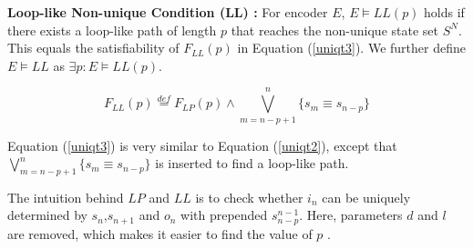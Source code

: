 \documentclass[journal]{IEEEtran}
\begin{document}
\begin{definition11}\label{def_llnc}%
\textbf{Loop-like Non-unique Condition ($\boldsymbol{LL}$) :}
For encoder $E$,
$E\vDash LL(p)$ holds if
there exists a loop-like path of length $p$ that reaches the non-unique state set $S^{N}$.
This equals the satisfiability of $F_{LL}(p)$ in Equation (\ref{uniqt3}).
We further define $E\vDash LL$ as $\exists p:E\vDash LL(p)$.



\end{definition11}


\begin{equation}\label{uniqt3}
F_{LL}(p)\overset{def}{=}F_{LP}(p)\wedge\bigvee_{m=n-p+1}^{n}\{s_m\equiv s_{n-p}\}
\end{equation}

Equation (\ref{uniqt3}) is very similar to Equation (\ref{uniqt2}),
except that $\bigvee_{m=n-p+1}^{n}\{s_m\equiv s_{n-p}\}$ is inserted to find a loop-like path.

The intuition behind $LP$ and $LL$ is to check
whether $i_n$ can be uniquely determined by $s_n$,$s_{n+1}$ and $o_n$ with prepended $s_{n-p}^{n-1}$.
Here,
parameters $d$ and $l$ are removed,
which makes it easier to find the value of $p$ .
\end{document}
